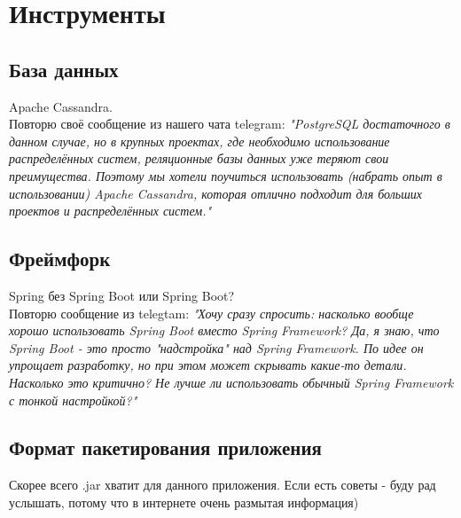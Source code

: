 \documentclass[12pt]{article}
\begin{document}
\section*{Инструменты}
\subsection*{База данных}
Apache Cassandra.\\
Повторю своё сообщение из нашего чата telegram: \textit{"PostgreSQL достаточного в данном случае, но в крупных проектах, 
где необходимо использование распределённых систем, реляционные базы данных уже теряют свои преимущества. 
Поэтому мы хотели поучиться  использовать (набрать опыт в использовании) Apache Cassandra, которая отлично подходит 
для больших проектов и распределённых систем."}

\subsection*{Фреймфорк}
Spring без Spring Boot или Spring Boot? \\
Повторю сообщение из telegtam: \textit{"Хочу сразу спросить: насколько вообще хорошо использовать Spring Boot вместо Spring Framework? 
Да, я знаю, что Spring Boot - это просто "надстройка" над Spring Framework.
По идее он упрощает разработку, но при этом может скрывать какие-то детали. Насколько это критично? 
Не лучше ли использовать обычный Spring Framework с тонкой настройкой?"}

\subsection*{Формат пакетирования приложения}
Скорее всего .jar хватит для данного приложения. Если есть советы - буду рад услышать, потому что в интернете очень размытая информация)
\end{document}
